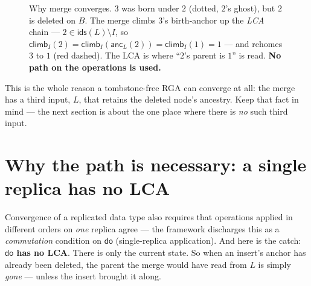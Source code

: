 \documentclass[11pt]{article}
\newcommand{\ids}{\mathsf{ids}}
\newcommand{\anc}{\mathsf{anc}}
\newcommand{\climb}{\mathsf{climb}}
\newcommand{\mrg}{\mathsf{merge}}
\newcommand{\doo}{\mathsf{do}}
\newcommand{\Ins}{\mathsf{Ins}}
\newcommand{\Del}{\mathsf{Del}}
\newcommand{\lca}{L}
\begin{document}
\begin{figure}[h]
\centering
{}
\caption{Why merge converges. $3$ was born under $2$ (dotted, $2$'s ghost), but
$2$ is deleted on $B$. The merge climbs $3$'s birth-anchor up the \emph{LCA}
chain --- $2 \in \ids(\lca)\setminus I$, so $\climb_I(2)=\climb_I(\anc_\lca(2))=
\climb_I(1)=1$ --- and rehomes $3$ to $1$ (red dashed). The LCA is where ``$2$'s
parent is $1$'' is read. \textbf{No path on the operations is used.}}
\label{fig:merge}
\end{figure}

This is the whole reason a tombstone-free RGA can converge at all: the merge has
a third input, $\lca$, that retains the deleted node's ancestry. Keep that fact in
mind --- the next section is about the one place where there is \emph{no} such
third input.

\section{Why the path is necessary: a single replica has no LCA}
\label{sec:path}

Convergence of a replicated data type also requires that operations applied in
different orders on \emph{one} replica agree --- the framework discharges this as a
\emph{commutation} condition on $\doo$ (single-replica application). And here is
the catch: \textbf{$\doo$ has no LCA}. There is only the current state. So when an
insert's anchor has already been deleted, the parent the merge would have read
from $\lca$ is simply \emph{gone} --- unless the insert brought it along.
\end{document}
